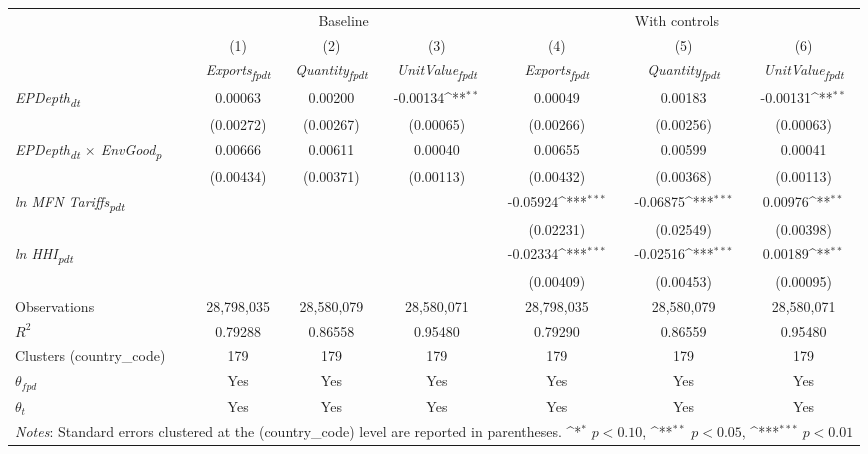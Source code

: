 {
\def\sym#1{\ifmmode^{#1}\else\(^{#1}\)\fi}
\begin{tabular}{l*{6}{c}}
\toprule
&\multicolumn{3}{c}{Baseline}&\multicolumn{3}{c}{With controls}\\\cmidrule(lr){2-4}\cmidrule(lr){5-7}
&(1)&(2)&(3)&(4)&(5)&(6)\\
&\textit{Exports\textsubscript{fpdt}}&\textit{Quantity\textsubscript{fpdt}}&\textit{UnitValue\textsubscript{fpdt}}&\textit{Exports\textsubscript{fpdt}}&\textit{Quantity\textsubscript{fpdt}}&\textit{UnitValue\textsubscript{fpdt}}\\
\midrule
\textit{EPDepth\textsubscript{dt}} & 0.00063 & 0.00200 & -0.00134\sym{**} & 0.00049 & 0.00183 & -0.00131\sym{**}\\
 & (0.00272) & (0.00267) & (0.00065) & (0.00266) & (0.00256) & (0.00063)\\
\addlinespace
\textit{EPDepth\textsubscript{dt} $\times$ EnvGood\textsubscript{p}} & 0.00666 & 0.00611 & 0.00040 & 0.00655 & 0.00599 & 0.00041\\
 & (0.00434) & (0.00371) & (0.00113) & (0.00432) & (0.00368) & (0.00113)\\
\addlinespace
\textit{ln MFN Tariffs\textsubscript{pdt}} &  &  &  & -0.05924\sym{***} & -0.06875\sym{***} & 0.00976\sym{**}\\
 &  &  &  & (0.02231) & (0.02549) & (0.00398)\\
\addlinespace
\textit{ln HHI\textsubscript{pdt}} &  &  &  & -0.02334\sym{***} & -0.02516\sym{***} & 0.00189\sym{**}\\
 &  &  &  & (0.00409) & (0.00453) & (0.00095)\\
\midrule
Observations & 28,798,035 & 28,580,079 & 28,580,071 & 28,798,035 & 28,580,079 & 28,580,071\\
$R^{2}$ & 0.79288 & 0.86558 & 0.95480 & 0.79290 & 0.86559 & 0.95480\\
Clusters (country_code) & 179 & 179 & 179 & 179 & 179 & 179\\
$\theta_{fpd}$ & Yes & Yes & Yes & Yes & Yes & Yes\\
$\theta_{t}$ & Yes & Yes & Yes & Yes & Yes & Yes\\
\bottomrule
\multicolumn{7}{l}{\footnotesize \textit{Notes}: Standard errors clustered at the (country_code) level are reported in parentheses. \sym{*} \(p<0.10\), \sym{**} \(p<0.05\), \sym{***} \(p<0.01\)}\\
\end{tabular}
}
